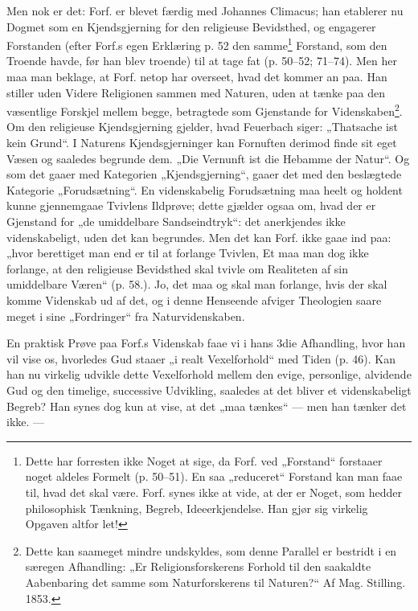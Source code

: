 \documentclass[12pt,a4paper]{book}
\newcommand{\opage}[1]{\marginnote{\footnotesize\textit{[#1]}}}
\begin{document}
Men nok er det: Forf. er blevet færdig med Johannes
Climacus; han etablerer nu Dogmet som en Kjendsgjerning
for den religieuse Bevidsthed, og engagerer Forstanden (efter
Forf.s egen Erklæring p. 52 den samme\footnote{Dette har forresten ikke Noget at sige, da Forf. ved „Forstand“ forstaaer noget aldeles Formelt (p. 50--51). En saa „reduceret“ Forstand kan man faae til, hvad det skal være. Forf. synes ikke at vide, at der er Noget, som hedder philosophisk Tænkning, Begreb, Ideeerkjendelse. Han gjør sig virkelig Opgaven altfor let!} Forstand, som
den Troende havde, før han blev troende) til at tage fat
(p. 50--52; 71--74). Men her maa man beklage, at Forf.
netop har overseet, hvad det kommer an paa. Han stiller
uden Videre Religionen sammen med Naturen, uden at tænke
paa den væsentlige Forskjel mellem begge, betragtede som Gjenstande
for Videnskaben\footnote{Dette kan saameget mindre undskyldes, som denne Parallel er bestridt i en særegen Afhandling: „Er Religionsforskerens Forhold til den saakaldte Aabenbaring det samme som Naturforskerens til Naturen?“ Af Mag. Stilling. 1853.}. Om den religieuse Kjendsgjerning
gjelder, hvad Feuerbach siger: „Thatsache ist kein Grund“.
I Naturens Kjendsgjerninger kan Fornuften derimod finde sit
eget Væsen og saaledes begrunde dem. „Die Vernunft ist
die Hebamme der Natur“. Og som det gaaer med Kategorien
„Kjendsgjerning“, gaaer det med den beslægtede Kategorie
„Forudsætning“. En videnskabelig Forudsætning maa heelt og
holdent kunne gjennemgaae Tvivlens Ildprøve; dette gjælder
ogsaa om, hvad der er Gjenstand for „de umiddelbare Sandse\opage{11}\setcounter{footnote}{0}indtryk“:
det anerkjendes ikke videnskabeligt, uden det kan begrundes.
Men det kan Forf. ikke gaae ind paa: „hvor berettiget
man end er til at forlange Tvivlen, Et maa man dog
ikke forlange, at den religieuse Bevidsthed skal tvivle om Realiteten
af sin umiddelbare Væren“ (p. 58.). Jo, det maa og
skal man forlange, hvis der skal komme Videnskab ud af det,
og i denne Henseende afviger Theologien saare meget i sine
„Fordringer“ fra Naturvidenskaben.

En praktisk Prøve paa Forf.s Videnskab faae vi i hans
3die Afhandling, hvor han vil vise os, hvorledes Gud staaer
„i realt Vexelforhold“ med Tiden (p. 46). Kan han nu
virkelig udvikle dette Vexelforhold mellem den evige, personlige,
alvidende Gud og den timelige, successive Udvikling, saaledes
at det bliver et videnskabeligt Begreb? Han synes dog kun at
vise, at det „maa tænkes“ --- men han tænker det ikke. ---
\end{document}
